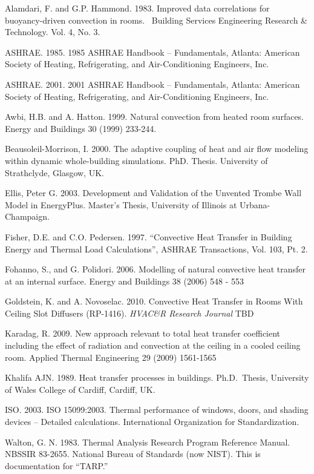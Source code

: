 Alamdari, F. and G.P. Hammond. 1983. Improved data correlations for buoyancy-driven convection in rooms.~ Building Services Engineering Research \& Technology. Vol. 4, No. 3.

ASHRAE. 1985. 1985 ASHRAE Handbook -- Fundamentals, Atlanta: American Society of Heating, Refrigerating, and Air-Conditioning Engineers, Inc.

ASHRAE. 2001. 2001 ASHRAE Handbook -- Fundamentals, Atlanta: American Society of Heating, Refrigerating, and Air-Conditioning Engineers, Inc.

Awbi, H.B. and A. Hatton. 1999. Natural convection from heated room surfaces. Energy and Buildings 30 (1999) 233-244.

Beausoleil-Morrison, I. 2000. The adaptive coupling of heat and air flow modeling within dynamic whole-building simulations. PhD. Thesis. University of Strathclyde, Glasgow, UK.

Ellis, Peter G. 2003. Development and Validation of the Unvented Trombe Wall Model in EnergyPlus. Master's Thesis, University of Illinois at Urbana-Champaign.

Fisher, D.E. and C.O. Pedersen. 1997. ``Convective Heat Transfer in Building Energy and Thermal Load Calculations'', ASHRAE Transactions, Vol. 103, Pt. 2.

Fohanno, S., and G. Polidori. 2006. Modelling of natural convective heat transfer at an internal surface. Energy and Buildings 38 (2006) 548 - 553

Goldstein, K. and A. Novoselac. 2010. Convective Heat Transfer in Rooms With Ceiling Slot Diffusers (RP-1416). \emph{HVAC\&R Research Journal} TBD

Karadag, R. 2009. New approach relevant to total heat transfer coefficient including the effect of radiation and convection at the ceiling in a cooled ceiling room. Applied Thermal Engineering 29 (2009) 1561-1565

Khalifa AJN. 1989. Heat transfer processes in buildings. Ph.D.~Thesis, University of Wales College of Cardiff, Cardiff, UK.

ISO. 2003. ISO 15099:2003. Thermal performance of windows, doors, and shading devices -- Detailed calculations. International Organization for Standardization.

Walton, G. N. 1983. Thermal Analysis Research Program Reference Manual. NBSSIR 83-2655. National Bureau of Standards (now NIST). This is documentation for ``TARP.''
